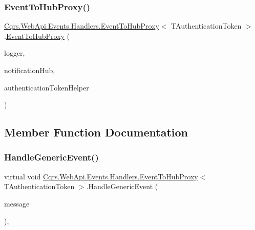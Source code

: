 \subsubsection{\texorpdfstring{Event\+To\+Hub\+Proxy()}{EventToHubProxy()}}
{\footnotesize\ttfamily \hyperlink{classCqrs_1_1WebApi_1_1Events_1_1Handlers_1_1EventToHubProxy}{Cqrs.\+Web\+Api.\+Events.\+Handlers.\+Event\+To\+Hub\+Proxy}$<$ T\+Authentication\+Token $>$.\hyperlink{classCqrs_1_1WebApi_1_1Events_1_1Handlers_1_1EventToHubProxy}{Event\+To\+Hub\+Proxy} (\begin{DoxyParamCaption}\item[{I\+Logger}]{logger,  }\item[{\hyperlink{interfaceCqrs_1_1WebApi_1_1SignalR_1_1Hubs_1_1INotificationHub}{I\+Notification\+Hub}}]{notification\+Hub,  }\item[{\hyperlink{interfaceCqrs_1_1Authentication_1_1IAuthenticationTokenHelper}{I\+Authentication\+Token\+Helper}$<$ T\+Authentication\+Token $>$}]{authentication\+Token\+Helper }\end{DoxyParamCaption})\hspace{0.3cm}{\ttfamily [protected]}}



\subsection{Member Function Documentation}
\mbox{\label{classCqrs_1_1WebApi_1_1Events_1_1Handlers_1_1EventToHubProxy_a310fc8d40bfbe514406716150f30b74d_a310fc8d40bfbe514406716150f30b74d}} 
\subsubsection{\texorpdfstring{Handle\+Generic\+Event()}{HandleGenericEvent()}}
{\footnotesize\ttfamily virtual void \hyperlink{classCqrs_1_1WebApi_1_1Events_1_1Handlers_1_1EventToHubProxy}{Cqrs.\+Web\+Api.\+Events.\+Handlers.\+Event\+To\+Hub\+Proxy}$<$ T\+Authentication\+Token $>$.Handle\+Generic\+Event (\begin{DoxyParamCaption}\item[{\hyperlink{interfaceCqrs_1_1Events_1_1IEvent}{I\+Event}$<$ T\+Authentication\+Token $>$}]{message }\end{DoxyParamCaption})\hspace{0.3cm}{\ttfamily [protected]}, {\ttfamily [virtual]}}



